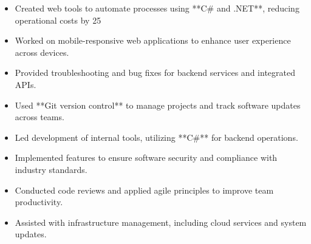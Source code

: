 \par\smallskip
\noindent
\begin{minipage}{20cm}
  \begin{minipage}{9.75cm}
    \begin{itemize}
      \item Created web tools to automate processes using **C# and .NET**, reducing operational costs by 25%
      \item Worked on mobile-responsive web applications to enhance user experience across devices.
    \end{itemize}
  \end{minipage}
  \hfill
  \begin{minipage}{9.75cm}
    \begin{itemize}
      \item Provided troubleshooting and bug fixes for backend services and integrated APIs.
      \item Used **Git version control** to manage projects and track software updates across teams.
    \end{itemize}
  \end{minipage}
\end{minipage}
\par\smallskip
\divider

\par\smallskip
\noindent
\begin{minipage}{20cm}
  \begin{minipage}{9.75cm}
    \begin{itemize}
      \item Led development of internal tools, utilizing **C#** for backend operations.
      \item Implemented features to ensure software security and compliance with industry standards.
    \end{itemize}
  \end{minipage}
  \hfill
  \begin{minipage}{9.75cm}
    \begin{itemize}
      \item Conducted code reviews and applied agile principles to improve team productivity.
      \item Assisted with infrastructure management, including cloud services and system updates.
    \end{itemize}
  \end{minipage}
\end{minipage}

